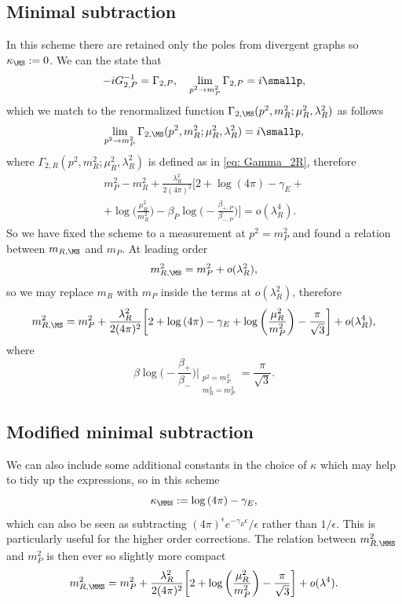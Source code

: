 \subsection{Minimal subtraction}
In this scheme there are retained only the poles from divergent graphs so $\kappa_\MS := 0$. We can the state that
\begin{equation}
    -iG_{2,P}^{-1} = \Gamma_{2,P},\quad \lim_{p^2 \to m_P^2}\Gamma_{2,P} = i\smallp,
\end{equation}
which we match to the renormalized function $\Gamma_{2,\MS}(p^2,m_R^2;\mu_R^2,\lambda_R^2)$ as follows
\begin{equation}
    \lim_{p^2 \to m_P^2}\Gamma_{2,\MS}(p^2,m_R^2;\mu_R^2,\lambda_R^2) = i\smallp,
\end{equation}
where $\Gamma_{2,R}(p^2,m_R^2;\mu_R^2,\lambda_R^2)$ is defined as in \eqref{eq: Gamma_2R}, therefore
\begin{multline}
    m_P^2 - m_R^2 + \frac{\lambda_R^2}{2(4\pi)^2}\bigg[2 + \log{(4\pi)} - \gamma_E + \\
    + \log{\bigg(\frac{\mu_R^2}{m_R^2}\bigg) - \beta_P\log{\bigg(-\frac{\beta_{+,P}}{\beta_{-,P}}\bigg)}}\bigg] = o(\lambda^4_R).
\end{multline}
So we have fixed the scheme to a measurement at $p^2 = m_P^2$ and found a relation between $m_{R,\MS}$ and $m_P$. At leading order 
\begin{equation}
    m_{R,\MS}^2 = m_P^2 + o(\lambda_R^2),
\end{equation}
so we may replace $m_R$ with $m_P$ inside the terms at $o(\lambda_R^2)$, therefore
\begin{equation}
    m_{R,\MS}^2 = m_P^2 + \frac{\lambda_R^2}{2(4\pi)^2}\bigg[2 + \log{(4\pi)} - \gamma_E + \log{\bigg(\frac{\mu_R^2}{m_P^2}\bigg) - \frac{\pi}{\sqrt{3}}}\bigg] + o(\lambda^4_R),
\end{equation}
where
\begin{equation}
    \beta\log{\bigg(-\frac{\beta_+}{\beta_-}\bigg)}\bigg|_{\substack{p^2 = m_P^2 \\ m_R^2 = m_P^2}} = \frac{\pi}{\sqrt{3}}.
\end{equation}

\subsection{Modified minimal subtraction}
We can also include some additional constants in the choice of $\kappa$ which may help to tidy up the expressions, so in this scheme 
\begin{equation}
    \kappa_{\MMS} := \log{(4\pi)} - \gamma_E,
\end{equation}
which can also be seen as subtracting $(4\pi)^\epsilon e^{-\gamma_E\epsilon}/\epsilon$ rather than $1/\epsilon$. This is particularly useful for the higher order corrections. The relation between $m_{R,\MMS}^2$ and $m_P^2$ is then ever so slightly more compact
\begin{equation}
    m_{R,\MMS}^2 = m_P^2 + \frac{\lambda_R^2}{2(4\pi)^2}\bigg[2 + \log{\bigg(\frac{\mu_R^2}{m_P^2}\bigg)} - \frac{\pi}{\sqrt{3}}\bigg] + o(\lambda^4).
\end{equation}

